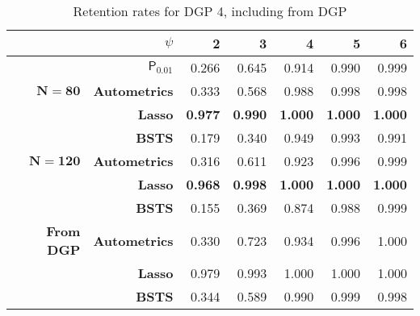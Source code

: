 \begin{table}[h]
  \centering

    \begin{tabular}{r|r|rrrrr}

          & \boldmath{}\textbf{$\psi$}\unboldmath{} & 2     & 3     & 4     & 5     & 6 \\
          \hline

          & $\textsf{P}_{0.01}$ & 0.266 & 0.645 & 0.914 & 0.990 & 0.999  \\
          \hline
    $\bm{N=80} $& \textbf{Autometrics} & 0.333 & 0.568 & 0.988 & 0.998 & 0.998 \\
    \textbf{} & \textbf{Lasso} & \textbf{0.977} & \textbf{0.990} & \textbf{1.000} & \textbf{1.000} & \textbf{1.000} \\
    \textbf{} & \textbf{BSTS} & 0.179 & 0.340 & 0.949 & 0.993 & 0.991 \\
    \hline
   $ \bm{N=120}$ & \textbf{Autometrics} & 0.316 & 0.611 & 0.923 & 0.996 & 0.999 \\
    \textbf{} & \textbf{Lasso} & \textbf{0.968} & \textbf{0.998} & \textbf{1.000} & \textbf{1.000} & \textbf{1.000} \\
    \textbf{} & \textbf{BSTS} & 0.155 & 0.369 & 0.874 & 0.988 & 0.999 \\
    \hline
    \textbf{From DGP} & \textbf{Autometrics} & 0.330 & 0.723 & 0.934 & 0.996 & 1.000 \\
          & \textbf{Lasso} & 0.979 & 0.993 & 1.000 & 1.000 & 1.000 \\
          & \textbf{BSTS} & 0.344 & 0.589 & 0.990 & 0.999 & 0.998 \\

    \end{tabular}%
      \caption{Retention rates for DGP 4, including from DGP}
  \label{tDGP4RR}%
\end{table}%


